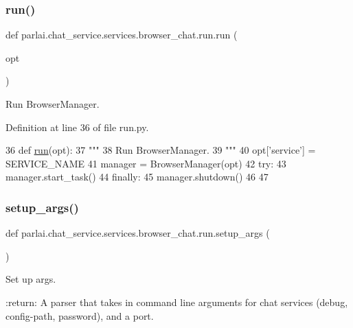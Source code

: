 \subsubsection{\texorpdfstring{run()}{run()}}
{\footnotesize\ttfamily def parlai.\+chat\+\_\+service.\+services.\+browser\+\_\+chat.\+run.\+run (\begin{DoxyParamCaption}\item[{}]{opt }\end{DoxyParamCaption})}

\begin{DoxyVerb}Run BrowserManager.
\end{DoxyVerb}
 

Definition at line 36 of file run.\+py.


\begin{DoxyCode}
36 \textcolor{keyword}{def }\hyperlink{namespaceparlai_1_1tasks_1_1talkthewalk_1_1run_a0a1ec08b8196cb008e4df83468c67e5b}{run}(opt):
37     \textcolor{stringliteral}{"""}
38 \textcolor{stringliteral}{    Run BrowserManager.}
39 \textcolor{stringliteral}{    """}
40     opt[\textcolor{stringliteral}{'service'}] = SERVICE\_NAME
41     manager = BrowserManager(opt)
42     \textcolor{keywordflow}{try}:
43         manager.start\_task()
44     \textcolor{keywordflow}{finally}:
45         manager.shutdown()
46 
47 
\end{DoxyCode}
\mbox{\label{namespaceparlai_1_1chat__service_1_1services_1_1browser__chat_1_1run_a4c6727a6d621a62295a39de7ecb804f7}} 
\subsubsection{\texorpdfstring{setup\+\_\+args()}{setup\_args()}}
{\footnotesize\ttfamily def parlai.\+chat\+\_\+service.\+services.\+browser\+\_\+chat.\+run.\+setup\+\_\+args (\begin{DoxyParamCaption}{ }\end{DoxyParamCaption})}

\begin{DoxyVerb}Set up args.

:return: A parser that takes in command line arguments for chat services (debug, config-path, password), and a port.
\end{DoxyVerb}
 


